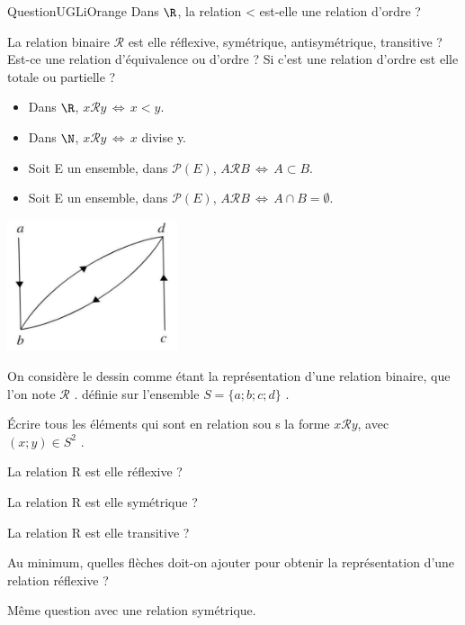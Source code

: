\begin{encadrecolore}{Question}{UGLiOrange}
    Dans $\R$, la relation < est-elle une relation d'ordre ?
\end{encadrecolore}

\begin{exercice}[]
    La relation binaire $\mathcal{R}$ est elle réflexive, symétrique, antisymétrique, transitive ? Est-ce une relation d'équivalence ou d'ordre ? Si c'est une relation d'ordre est elle totale ou partielle ?
    \begin{itemize}
        \item 	Dans $\R$, $x\mathcal{R}y\,\Leftrightarrow\, x<y$.
        \item 	Dans $\N$, $x\mathcal{R}y\,\Leftrightarrow\,x$ divise y.
        \item 	Soit E un ensemble, dans $\mathcal{P}(E)$, $A\mathcal{R}B\,\Leftrightarrow\, A\subset B$.
        \item 	Soit E un ensemble, dans $\mathcal{P}(E)$, $A\mathcal{R}B\,\Leftrightarrow\, A\cap B=\emptyset$.\\
    \end{itemize}
\end{exercice}

\begin{exercice}[]
    \begin{center}
        \includegraphics[width=5cm]{ensembles/img/graphe.PNG}
    \end{center}


    On considère le dessin comme étant la représentation d'une relation binaire, que l'on note $\mathcal{R}$ . définie sur l'ensemble $S = \lbrace  a;b;c;d\rbrace$ .

    \begin{enumalph}
        \item 	Écrire tous les éléments qui sont en relation sou s la forme $x\mathcal{R}y$, avec $(x;y) \in S^2$ .
        \item 	La relation R est elle réflexive ?
        \item 	La relation R est elle symétrique ?
        \item 	La relation R est elle transitive ?
        \item 	Au minimum, quelles flèches doit-on ajouter pour obtenir la représentation d'une
        relation réflexive ?
        \item Même question avec une relation symétrique.
    \end{enumalph}
\end{exercice}

